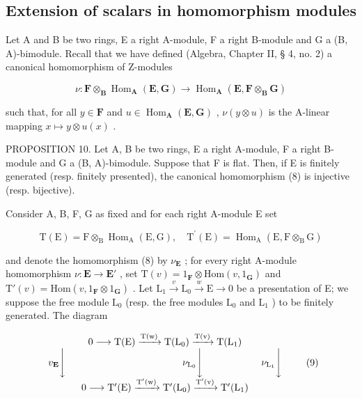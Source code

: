 \subsection{Extension of scalars in homomorphism modules}

Let A and B be two rings, E a right A-module, F a right B-module and G a (B, A)-bimodule. Recall that we have defined (Algebra, Chapter II, § 4, no. 2) a canonical homomorphism of Z-modules

\[
\nu \colon \mathbf {F} \otimes_ {\mathbf {B}} \operatorname{Hom} _ {\mathbf {A}} (\mathbf {E}, \mathbf {G}) \rightarrow \operatorname{Hom} _ {\mathbf {A}} (\mathbf {E}, \mathbf {F} \otimes_ {\mathbf {B}} \mathbf {G})\tag{8}
\]

such that, for all \(y \in \mathbf{F}\) and \(u \in \operatorname{Hom}_{\mathbf{A}}(\mathbf{E}, \mathbf{G})\) , \(\nu(y \otimes u)\) is the A-linear mapping \(x \mapsto y \otimes u(x)\) .

PROPOSITION 10. Let A, B be two rings, E a right A-module, F a right B-module and G a (B, A)-bimodule. Suppose that F is flat. Then, if E is finitely generated (resp. finitely presented), the canonical homomorphism (8) is injective (resp. bijective).

Consider A, B, F, G as fixed and for each right A-module E set

\[
\mathrm{T} (\mathrm{E}) = \mathrm{F} \otimes_ {\mathrm{B}} \operatorname{Hom} _ {\mathrm{A}} (\mathrm{E}, \mathrm{G}), \quad \mathrm{T} ^ {\prime} (\mathrm{E}) = \operatorname{Hom} _ {\mathrm{A}} (\mathrm{E}, \mathrm{F} \otimes_ {\mathrm{B}} \mathrm{G})
\]

and denote the homomorphism (8) by \(\nu_{\mathbf{E}}\) ; for every right A-module homomorphism \(\nu: \mathbf{E} \to \mathbf{E}'\) , set \(\mathrm{T}(v) = 1_{\mathbf{F}} \otimes \mathrm{Hom}(v, 1_{\mathbf{G}})\) and \(\mathrm{T}'(v) = \mathrm{Hom}(v, 1_{\mathbf{F}} \otimes 1_{\mathbf{G}})\) . Let \(\mathrm{L}_1 \xrightarrow{v} \mathrm{L}_0 \xrightarrow{w} \mathrm{E} \to 0\) be a presentation of E; we suppose the free module \(\mathrm{L}_0\) (resp. the free modules \(\mathrm{L}_0\) and \(\mathrm{L}_1\) ) to be finitely generated. The diagram

\[
\begin{array}{c} 0 \longrightarrow \mathrm{T(E)} \xrightarrow {\mathrm{T(w)}} \mathrm {T(L_ {0})} \xrightarrow {\mathrm{T(v)}} \mathrm {T(L_ {1})} \\ v _ {\mathbf {E}} \Biggl \downarrow \qquad \qquad \qquad \qquad \qquad \qquad \nu_ {\mathrm {L_ {0}}} \Biggl \downarrow \qquad \qquad \qquad \nu_ {\mathrm {L_ {1}}} \Biggl \downarrow \\ 0 \longrightarrow \mathrm {T^ {\prime} (E)} \xrightarrow {\mathrm {T^ {\prime} (w)}} \mathrm {T^ {\prime} (L_ {0})} \xrightarrow {\mathrm {T^ {\prime} (v)}} \mathrm {T^ {\prime} (L_ {1})} \end{array}\tag{9}
\]

